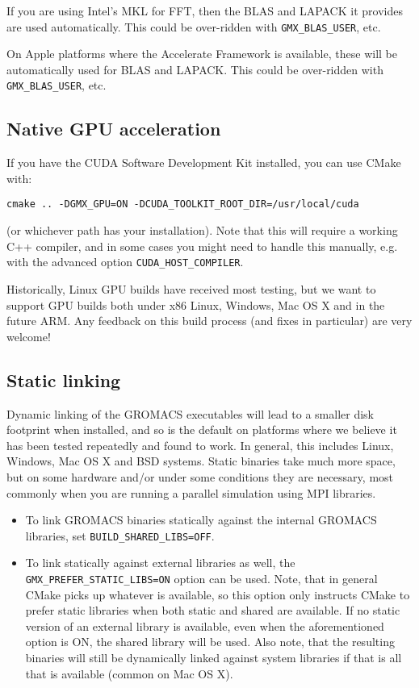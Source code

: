 \documentclass{article}[12pt,a4paper,twoside]
\newcommand{\gromacs}{GROMACS}
\newcommand{\cuda}{CUDA}
\newcommand{\mkl}{MKL}
\newcommand{\cmake}{CMake}
\newcommand{\fft}{FFT}
\newcommand{\blas}{BLAS}
\newcommand{\lapack}{LAPACK}
\begin{document}
If you are using Intel's \mkl{} for \fft{}, then the \blas{} and
\lapack{} it provides are used automatically. This could be
over-ridden with \verb+GMX_BLAS_USER+, etc.

On Apple platforms where the Accelerate Framework is available, these
will be automatically used for \blas{} and \lapack{}. This could be
over-ridden with \verb+GMX_BLAS_USER+, etc.

\subsection{Native GPU acceleration}
If you have the \cuda{} Software Development Kit installed, you can
use \cmake{} with:
\begin{verbatim}
cmake .. -DGMX_GPU=ON -DCUDA_TOOLKIT_ROOT_DIR=/usr/local/cuda
\end{verbatim}
(or whichever path has your installation). Note that this will require
a working C++ compiler, and in some cases you might need to handle
this manually, e.g. with the advanced option
\verb+CUDA_HOST_COMPILER+.

Historically, Linux GPU builds have received most testing, but we 
want to support GPU builds both under x86 Linux, Windows, Mac OS X and in the
future ARM. Any feedback on this build process (and fixes in particular) are very
welcome!

\subsection{Static linking}
Dynamic linking of the \gromacs{} executables will lead to a
smaller disk footprint when installed, and so is the default on
platforms where we believe it has been tested repeatedly and found to work.
In general, this includes Linux, Windows, Mac OS X and BSD systems.
Static binaries take much more space, but on some hardware and/or under
some conditions they are necessary, most commonly when you are running a parallel
simulation using MPI libraries. 

\begin{itemize}
\item To link \gromacs{} binaries
statically against the internal \gromacs{} libraries, set
\verb+BUILD_SHARED_LIBS=OFF+.
\item To link statically against external
libraries as well, the \verb+GMX_PREFER_STATIC_LIBS=ON+ option can be
used. Note, that in general \cmake{} picks up whatever is available,
so this option only instructs \cmake{} to prefer static libraries when
both static and shared are available. If no static version of an
external library is available, even when the aforementioned option is
ON, the shared library will be used. Also note, that the resulting
binaries will still be dynamically linked against system libraries if
that is all that is available (common on Mac OS X).
\end{itemize}
\end{document}
